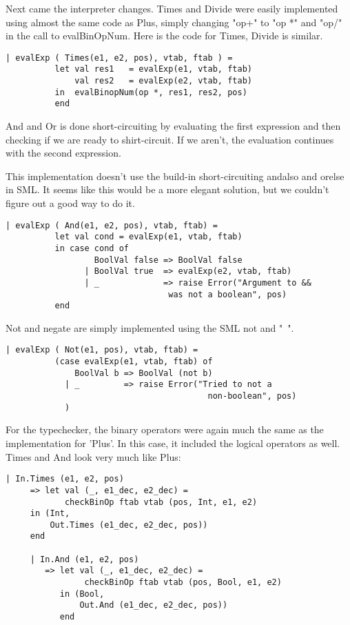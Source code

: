 \documentclass[10pt]{article}
\begin{document}
Next came the interpreter changes. Times and Divide were easily implemented using almost the same code as Plus, simply changing "op+" to "op *" and "op/" in the call to evalBinOpNum. Here is the code for Times, Divide is similar.

\begin{Verbatim}[frame=single]
    | evalExp ( Times(e1, e2, pos), vtab, ftab ) =
          let val res1   = evalExp(e1, vtab, ftab)
              val res2   = evalExp(e2, vtab, ftab)
          in  evalBinopNum(op *, res1, res2, pos)
          end
\end{Verbatim}

And and Or is done short-circuiting by evaluating the first expression and then checking if we are ready to shirt-circuit. If we aren't, the evaluation continues with the second expression.

This implementation doesn't use the build-in short-circuiting andalso and orelse in SML. It seems like this would be a more elegant solution, but we couldn't figure out a good way to do it.

\begin{Verbatim}[frame=single]
    | evalExp ( And(e1, e2, pos), vtab, ftab) =
          let val cond = evalExp(e1, vtab, ftab)
          in case cond of
                  BoolVal false => BoolVal false
                | BoolVal true  => evalExp(e2, vtab, ftab)
                | _             => raise Error("Argument to && 
                                 was not a boolean", pos)
          end
\end{Verbatim}

Not and negate are simply implemented using the SML not and "~".

\begin{Verbatim}[frame=single]
    | evalExp ( Not(e1, pos), vtab, ftab) =
          (case evalExp(e1, vtab, ftab) of
              BoolVal b => BoolVal (not b)
            | _         => raise Error("Tried to not a
            							 non-boolean", pos)
            )
\end{Verbatim}

For the typechecker, the binary operators were again much the same as the implementation for 'Plus'. In this case, it included the logical operators as well. Times and And look very much like Plus:

\begin{Verbatim}[frame=single]
   | In.Times (e1, e2, pos)
     => let val (_, e1_dec, e2_dec) = 
     		checkBinOp ftab vtab (pos, Int, e1, e2)
     in (Int,
         Out.Times (e1_dec, e2_dec, pos))
     end

     | In.And (e1, e2, pos)
        => let val (_, e1_dec, e2_dec) = 
        		checkBinOp ftab vtab (pos, Bool, e1, e2) 
           in (Bool,
               Out.And (e1_dec, e2_dec, pos))
           end

\end{Verbatim}
\end{document}
